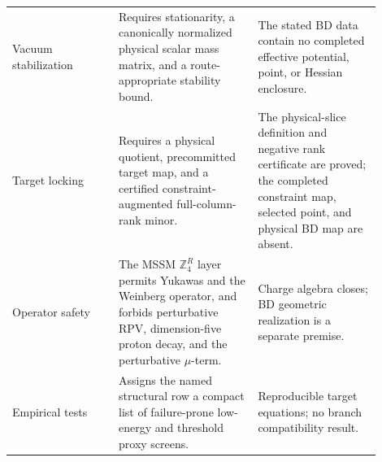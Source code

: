 \documentclass[11pt]{article}
\theoremstyle{remark}
\theoremstyle{plain}
\newcommand{\ZfourR}{\mathbb Z_4^R}
\begin{document}
\begin{longtable}{L{0.26\linewidth}L{0.34\linewidth}L{0.30\linewidth}}
Vacuum stabilization & Requires stationarity, a canonically normalized physical scalar mass
matrix, and a route-appropriate stability bound. & The stated BD data contain no completed
effective potential, point, or Hessian enclosure. \\
Target locking & Requires a physical quotient, precommitted target map, and a certified
constraint-augmented full-column-rank minor. & The physical-slice definition and negative rank
certificate are proved; the completed constraint map, selected point, and physical BD map are absent. \\
Operator safety & The MSSM \(\ZfourR\) layer permits Yukawas and the Weinberg operator, and
forbids perturbative RPV, dimension-five proton decay, and the perturbative \(\mu\)-term. &
Charge algebra closes; BD geometric realization is a separate premise. \\
Empirical tests & Assigns the named structural row a compact list of failure-prone low-energy and
threshold proxy screens. & Reproducible target equations; no branch compatibility result. \\
\bottomrule
\end{longtable}
\end{document}
